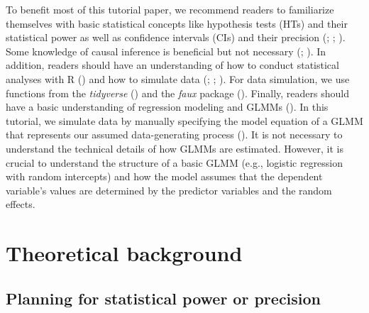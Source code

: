 \documentclass[
  man,
  floatsintext,
  longtable,
  a4paper,
  nolmodern,
  notxfonts,
  notimes,
  colorlinks=true,linkcolor=blue,citecolor=blue,urlcolor=blue]{apa7}
\begin{document}
To benefit most of this tutorial paper, we recommend readers to
familiarize themselves with basic statistical concepts like hypothesis
tests (HTs) and their statistical power as well as confidence intervals
(CIs) and their precision
(;
;
). Some knowledge of causal inference is beneficial but not
necessary
(; ). In addition, readers should have an understanding of how to
conduct statistical analyses with R
() and
how to simulate data
(;
;
). For data
simulation, we use functions from the \emph{tidyverse}
() and
the \emph{faux} package ().
Finally, readers should have a basic understanding of regression
modeling and GLMMs
().
In this tutorial, we simulate data by manually specifying the model
equation of a GLMM that represents our assumed data-generating process
(). It is not necessary to understand the technical details of
how GLMMs are estimated. However, it is crucial to understand the
structure of a basic GLMM (e.g., logistic regression with random
intercepts) and how the model assumes that the dependent variable's
values are determined by the predictor variables and the random effects.

\section{Theoretical background}\label{theoretical-background}

\subsection{Planning for statistical power or
precision}\label{planning-for-statistical-power-or-precision}
\end{document}
